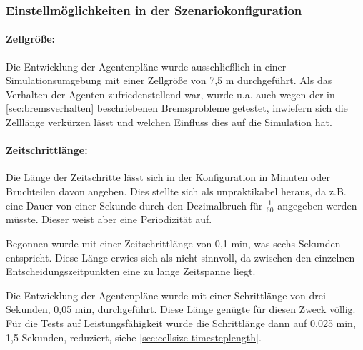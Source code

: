 \subsubsection{Einstellmöglichkeiten in der Szenariokonfiguration}
\label{einstellungen-szenario}


\paragraph*{Zellgröße:}
\label{zellgroesse-zeitschritte}
Die Entwicklung der Agentenpläne wurde ausschließlich in einer Simulationsumgebung mit einer Zellgröße von 7,5 m durchgeführt.
Als das Verhalten der Agenten zufriedenstellend war, wurde u.a. auch wegen der in \cref{sec:bremsverhalten} beschriebenen Bremsprobleme getestet, inwiefern sich die Zelllänge verkürzen lässt und welchen Einfluss dies auf die Simulation hat.


\paragraph*{Zeitschrittlänge:}
Die Länge der Zeitschritte lässt sich in der Konfiguration in Minuten oder Bruchteilen davon angeben. 
Dies stellte sich als unpraktikabel heraus, da z.B. eine Dauer von einer Sekunde durch den Dezimalbruch für $\frac{1}{60}$ angegeben werden müsste. Dieser weist aber eine Periodizität auf.

Begonnen wurde mit einer Zeitschrittlänge von 0,1 min, was sechs Sekunden entspricht. 
Diese Länge erwies sich als nicht sinnvoll, da zwischen den einzelnen Entscheidungszeitpunkten eine zu lange Zeitspanne liegt.

Die Entwicklung der Agentenpläne wurde mit einer Schrittlänge von drei Sekunden, 0,05 min, durchgeführt. Diese Länge genügte für diesen Zweck völlig.
Für die Tests auf Leistungsfähigkeit wurde die Schrittlänge dann auf 0.025 min, 1,5 Sekunden, reduziert, siehe \cref{sec:cellsize-timesteplength}.

